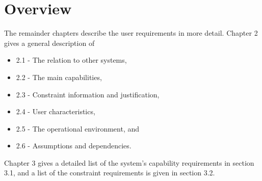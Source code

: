 



\section{Overview}

The remainder chapters describe the user requirements in more detail. Chapter 2 gives a general description of
\begin{itemize}
\item 2.1 - The relation to other systems,
\item 2.2 - The main capabilities,
\item 2.3 - Constraint information and justification,
\item 2.4 - User characteristics,
\item 2.5 - The operational environment, and
\item 2.6 - Assumptions and dependencies.
\end{itemize}

Chapter 3 gives a detailed list of the system's capability requirements in section 3.1, and a list of the constraint requirements is given in section 3.2.


